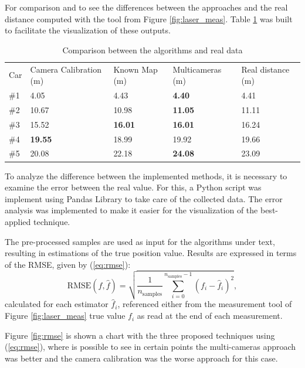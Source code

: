 For comparison and to see the differences between the approaches and the real distance computed with the tool from Figure \ref{fig:laser_meas}. Table \ref{tab:total} was built to facilitate the visualization of these outputs. 


\begin{table}[H]
\centering
\caption{Comparison between the algorithms and real data}
\begin{tabular}{l|l|l|l|l} 
\toprule
Car & Camera Calibration (m) & Known Map (m) & Multicameras (m) & Real distance (m) \\
\#1   & 4.05          & 4.43           & \textbf{4.40 }          & 4.41 \\
\#2   & 10.67         & 10.98          & \textbf{11.05 }         & 11.11\\
\#3   & 15.52         & \textbf{16.01}          &\textbf{ 16.01 }         & 16.24\\
\#4   & \textbf{19.55}         & 18.99          & 19.92          & 19.66\\
\#5   & 20.08         & 22.18          & \textbf{24.08}          & 23.09\\
\bottomrule
\end{tabular}
\label{tab:total}
\end{table} 

To analyze the difference between the implemented methods, it is necessary to examine the error between the real value. For this, a Python script was implement using Pandas Library \cite{mckinney2011pandas} to take care of the collected data. The error analysis was implemented to make it easier for the visualization of the best-applied technique. 

The pre-processed samples are used as input for the algorithms under text, resulting in estimations of the true position value. Results are expressed in terms of the RMSE, given by (\ref{eq:rmse}):
%
\begin{equation} \label{eq:rmse}
\text{RMSE}(f, \hat{f}) = \sqrt{\frac{1}{n_\text{samples}} \sum_{i=0}^{n_\text{samples} - 1} (f_i - \hat{f}_i)^2},
\end{equation}
%
calculated for each estimator $\hat{f}_i$, referenced either from the measurement tool of Figure \ref{fig:laser_meas} true value $f_i$ as read at the end of each measurement.

Figure \ref{fig:rmse} is shown a chart with the three proposed techniques using (\ref{eq:rmse}), where is possible to see in certain points the multi-cameras approach was better and the camera calibration was the worse approach for this case. 

